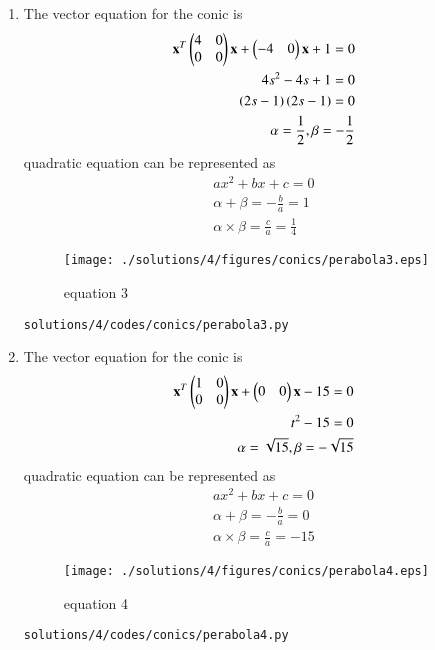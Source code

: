 \begin{enumerate}[label=\arabic*.,ref=\thesubsection.\theenumi]
\item The vector equation for the conic is
\begin{align}
\mathbf{x}^T\begin{pmatrix}4 & 0\\0 & 0\end{pmatrix}\mathbf{x} + \begin{pmatrix}-4 & 0\end{pmatrix}\mathbf{x} +1 = 0
\\
4s^2-4s+1 = 0
\\
\left(2s-1\right)\left(2s - 1\right) = 0
\\
\alpha = \frac{1}{2} ,\beta =-\frac{1}{2} 
\end{align}
quadratic equation can be represented as 
\begin{align}
ax^2+bx +c = 0
\\
\alpha +\beta = -\frac{b}{a} = 1
\\
\alpha \times \beta = \frac{c}{a} = \frac{1}{4}
\end{align}
\begin{figure}[!ht]
	\centering
	\texttt{[image: ./solutions/4/figures/conics/perabola3.eps]}
	\caption{equation 3 }
	\label{fig:5.2.3_perabola3}
\end{figure}
\begin{lstlisting}
solutions/4/codes/conics/perabola3.py
\end{lstlisting}

\item The vector equation for the conic is
\begin{align}
\mathbf{x}^T\begin{pmatrix}1 & 0\\0 & 0\end{pmatrix}\mathbf{x} + \begin{pmatrix}0 & 0\end{pmatrix}\mathbf{x} -15= 0
\\
t^2 - 15 = 0
\\
\alpha = \sqrt {15} ,\beta =-\sqrt {15} 
\end{align}
quadratic equation can be represented as 
\begin{align}
ax^2+bx +c = 0
\\
\alpha +\beta = -\frac{b}{a} = 0
\\
\alpha \times \beta = \frac{c}{a} = -15
\end{align}
\begin{figure}[!ht]
	\centering
	\texttt{[image: ./solutions/4/figures/conics/perabola4.eps]}
	\caption{equation 4 }
	\label{fig:5.2.3_perabola4}
\end{figure}
\begin{lstlisting}
solutions/4/codes/conics/perabola4.py
\end{lstlisting}


\end{enumerate}
